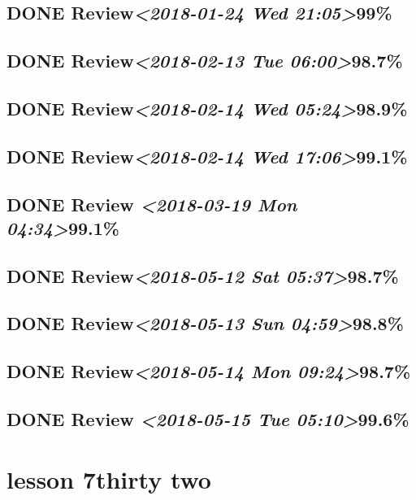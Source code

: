\documentclass[11pt]{ctexart}
\begin{document}
\subsection{{\bfseries\sffamily DONE} Review\textit{<2018-01-24 Wed 21:05>}99\%}
\label{sec:org29ccfdb}
\subsection{{\bfseries\sffamily DONE} Review\textit{<2018-02-13 Tue 06:00>}98.7\%}
\label{sec:orgf66dd1f}
\subsection{{\bfseries\sffamily DONE} Review\textit{<2018-02-14 Wed 05:24>}98.9\%}
\label{sec:orge1a9131}
\subsection{{\bfseries\sffamily DONE} Review\textit{<2018-02-14 Wed 17:06>}99.1\%}
\label{sec:org52c7805}
\subsection{{\bfseries\sffamily DONE} Review \textit{<2018-03-19 Mon 04:34>}99.1\%}
\label{sec:org0839de5}
\subsection{{\bfseries\sffamily DONE} Review\textit{<2018-05-12 Sat 05:37>}98.7\%}
\label{sec:org55ca782}
\subsection{{\bfseries\sffamily DONE} Review\textit{<2018-05-13 Sun 04:59>}98.8\%}
\label{sec:org78d7525}
\subsection{{\bfseries\sffamily DONE} Review\textit{<2018-05-14 Mon 09:24>}98.7\%}
\label{sec:org3074e78}
\subsection{{\bfseries\sffamily DONE} Review \textit{<2018-05-15 Tue 05:10>}99.6\%}
\label{sec:orga942fa6}
\section{lesson 7thirty two}
\label{sec:org8a6ed33}
\end{document}
